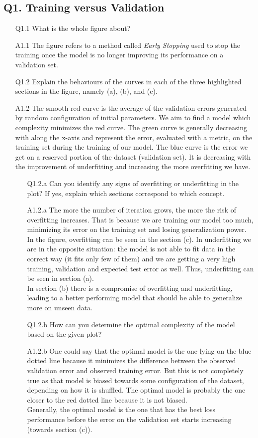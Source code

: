 \documentclass[11pt]{scrartcl}
\begin{document}
\subsection*{Q1. Training versus Validation}
\begin{itemize}
\item[Q1.1] What is the whole figure about?  
\item[A1.1] The figure refers to a method called \textit{Early Stopping} used to stop the training once the model is no longer improving its performance on a validation set.
\item[Q1.2] Explain the behaviours of the curves in each of the three highlighted sections in the figure, namely (a), (b), and (c).   
\item[A1.2] The smooth red curve is the average of the validation errors generated by random configuration of initial parameters. We aim to find a model which complexity minimizes the red curve. The green curve is generally decreasing with along the x-axis and represent the error, evaluated with a metric, on the training set during the training of our model. The blue curve is the error we get on a reserved portion of the dataset (validation set). It is decreasing with the improvement of underfitting and increasing the more overfitting we have. 

\begin{itemize}
\item[Q1.2.a] Can you identify any signs of overfitting or underfitting in the plot? If yes, explain which sections correspond to which concept.
\item[A1.2.a] The more the number of iteration grows, the more the risk of overfitting increases. That is because we are training our model too much, minimizing its error on the training set and losing generalization power. In the figure, overfitting can be seen in the section (c). In underfitting we are in the opposite situation: the model is not able to fit data in the correct way (it fits only few of them) and we are getting a very high training, validation and expected test error as well. Thus, underfitting can be seen in section (a).\\
In section (b) there is a compromise of overfitting and underfitting, leading to a better performing model that should be able to generalize more on unseen data.

\item[Q1.2.b] How can you determine the optimal complexity of the model based on the given plot?
\item[A1.2.b] One could say that the optimal model is the one lying on the blue dotted line because it minimizes the difference between the observed validation error and observed training error. But this is not completely true as that model is biased towards some configuration of the dataset, depending on how it is shuffled. The optimal model is probably the one closer to the red dotted line because it is not biased. \\
Generally, the optimal model is the one that has the best loss performance before the error on the validation set starts increasing (towards section (c)).
\end{itemize}
	

\end{itemize}
\end{document}
